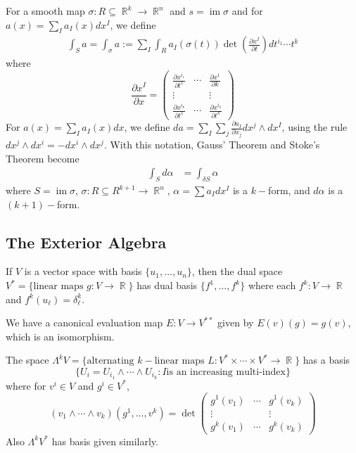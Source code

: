 \documentclass[11pt, a4paper]{memoir}
\DeclareMathOperator{\R}{{\mathbb{R}}}
\theoremstyle{change}
\theoremstyle{plain}
\theoremstyle{nonumberplain}
\DeclareMathOperator{\im}{im}
\newcommand{\prt}[2]{\ensuremath{\frac{\partial #1}{\partial #2}}}
\numberwithin{equation}{section}
\begin{document}
For a smooth map $\sigma:R\subseteq\R^k\to\R^n$ and $s=\im\sigma$ and for $a(x)=\sum_Ia_I(x)dx^{I}$, we define
\begin{align*}
    \int_S a=\int_\sigma a:=\sum_I\int_R a_I(\sigma(t))\det\left(\prt{x^I}{t}\right)dt^{i_1}\cdots t^{k}
\end{align*}
where
\begin{equation*}
    \prt{x^I}{x}=\begin{pmatrix}
        \prt{x^{i_1}}{t^1} & \cdots & \prt{x^{1}}{k}\\
        \vdots&&\vdots\\
        \prt{x^{i_k}}{t^1} & \cdots & \prt{x^{i_k}}{t^k}
    \end{pmatrix}
\end{equation*}
For $a(x)=\sum_Ia_I(x) dx$, we define $da=\sum_I\sum_j\prt{a_I}{x_j}dx^j\wedge dx^I$, using the rule $dx^j\wedge dx^i=-dx^i\wedge dx^j$.
With this notation, Gauss' Theorem and Stoke's Theorem become
\begin{align*}
    \int_S d\alpha &= \int_{\delta S}\alpha 
\end{align*}
where $S=\im\sigma$, $\sigma:R\subseteq R^{k+1}\to\R^n$, $\alpha=\sum a_Idx^I$ is a $k-$form, and $d\alpha$ is a $(k+1)-$form.
\subsection{The Exterior Algebra}
If $V$ is a vector space with basis $\{u_1,\ldots,u_n\}$, then the dual space $V^*=\{\text{linear maps }g:V\to\R\}$ has dual basis $\{f^1,\ldots,f^k\}$ where each $f^k:V\to\R$ and $f^k(u_\ell)=\delta^k_\ell$.

We have a canonical evaluation map $E:V\to V^{**}$ given by $E(v)(g)=g(v)$, which is an isomorphism.

The space $\Lambda^kV=\{\text{alternating $k-$linear maps }L:V^*\times\cdots\times V^*\to\R\}$ has a basis
\begin{equation*}
    \{U_i=U_{i_1}\wedge\cdots\wedge U_{i_k}:I\text{is an increasing multi-index}\}
\end{equation*}
where for $v^i\in V$ and $g^i\in V^*$,
\begin{equation*}
    (v_1\wedge\cdots\wedge v_k)(g^1,\ldots,v^k)=\det
    \begin{pmatrix}
        g^1(v_1) & \cdots & g^1(v_k)\\
        \vdots && \vdots\\
        g^k(v_1) & \cdots & g^k(v_k)
    \end{pmatrix}
\end{equation*}
Also $\Lambda^kV^*$ has basis given similarly.
\end{document}
